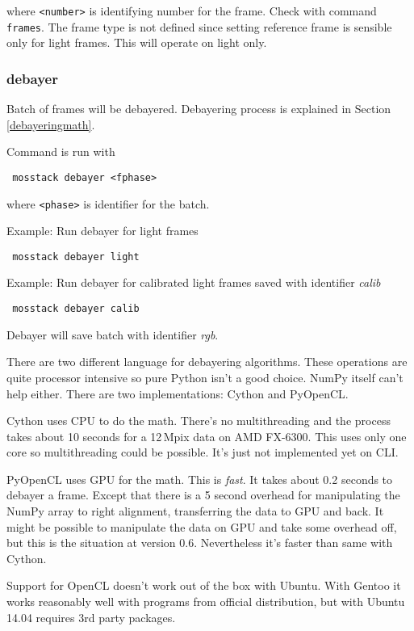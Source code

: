 \documentclass[twoside,a4paper]{refart}
\begin{document}
where \texttt{<number>} is identifying number for the frame. Check with command \texttt{frames}. The frame
type is not defined since setting reference frame is sensible only for light frames. This will operate
on light only.

\subsubsection{debayer}
\label{debayering}
Batch of frames will be debayered. Debayering process is explained in Section \ref{debayeringmath}.

Command is run with
\begin{verbatim}
 mosstack debayer <fphase>
\end{verbatim}

where \texttt{<phase>} is identifier for the batch.

Example: Run debayer for light frames

\begin{verbatim}
 mosstack debayer light
\end{verbatim}

Example: Run debayer for calibrated light frames saved with identifier \textit{calib}

\begin{verbatim}
 mosstack debayer calib
\end{verbatim}

Debayer will save batch with identifier \textit{rgb}.

There are two different language for debayering algorithms. These operations are quite processor intensive
so pure Python isn't a good choice. NumPy itself can't help either. There are two implementations: Cython and 
PyOpenCL.

Cython uses CPU to do the math. There's no multithreading and the process takes about 10 seconds for a 12\,Mpix
data on AMD FX-6300. This uses only one core so multithreading could be possible. It's just not implemented
yet on CLI.

PyOpenCL uses GPU for the math. This is \emph{fast}. It takes about 0.2 seconds to debayer a frame. Except 
that there is a 5 second overhead for manipulating the NumPy array to right alignment, transferring the 
data to GPU and back. It might be possible to manipulate the data on GPU and take some overhead off, but
this is the situation at version 0.6. Nevertheless it's faster than same with Cython.

Support for OpenCL doesn't work out of the box with Ubuntu. With Gentoo it works reasonably well
with programs from official distribution, but with Ubuntu 14.04 requires 3rd party packages. 
\end{document}

